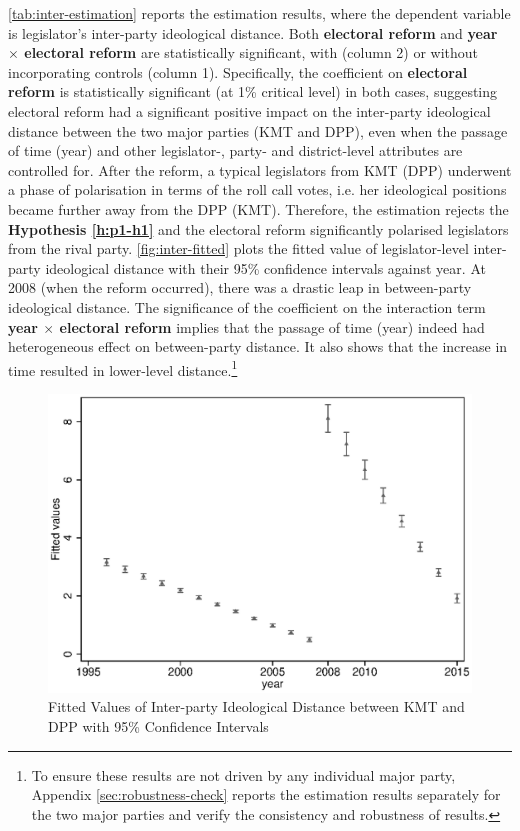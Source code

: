 \autoref{tab:inter-estimation} reports the estimation results, where the dependent variable is legislator's inter-party ideological distance. Both \textbf{electoral reform} and \textbf{year $\times$ electoral reform }are statistically significant, with (column 2) or without incorporating controls (column 1). Specifically, the coefficient on \textbf{electoral reform} is statistically significant (at 1\% critical level) in both cases, suggesting electoral reform had a significant positive impact on the inter-party ideological distance between the two major parties (KMT and DPP), even when the passage of time (year) and other legislator-, party- and district-level attributes are controlled for. After the reform, a typical legislators from KMT (DPP) underwent a phase of polarisation in terms of the roll call votes, i.e. her ideological positions became further away from the DPP (KMT). Therefore, the estimation rejects the \textbf{Hypothesis \ref{h:p1-h1}} and the electoral reform significantly polarised legislators from the rival party. \autoref{fig:inter-fitted} plots the fitted value of legislator-level inter-party ideological distance with their 95\% confidence intervals against year. At 2008 (when the reform occurred), there was a drastic leap in between-party ideological distance. The significance of the coefficient on the interaction term \textbf{year $\times$ electoral reform} implies that the passage of time (year) indeed had heterogeneous effect on between-party distance. It also shows that the increase in time resulted in lower-level distance.\footnote{To ensure these results are not driven by any individual major party, Appendix \ref{sec:robustness-check} reports the estimation results separately for the two major parties and verify the consistency and robustness of results.} 

\begin{figure}[ht]
\caption{Fitted Values of Inter-party Ideological Distance between KMT and DPP with 95\% Confidence Intervals \label{fig:inter-fitted}}\centering{}\includegraphics[scale=0.59]{02-Chapter-Two/image/all_inter.eps}
\end{figure}

